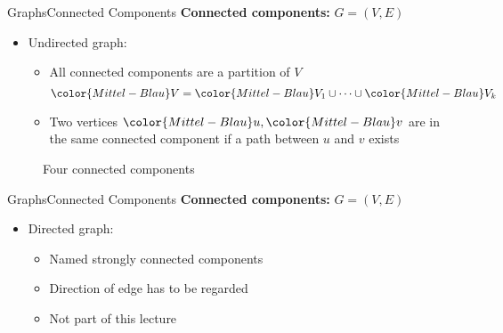 
\begin{frame}{Graphs}{Connected Components}
  \textbf{Connected components:}
  {\color{Mittel-Blau}$G = (V , E)$}
  \begin{itemize}
    \item
      Undirected graph:
      \begin{itemize}
        \item
          All connected components are a partition of {\color{Mittel-Blau}$V$}
          \begin{displaymath}
            {\color{Mittel-Blau}V}
              = {\color{Mittel-Blau}V_1} \cup \dots \cup 
              {\color{Mittel-Blau}V_k}
          \end{displaymath}
        \item
          Two vertices ${\color{Mittel-Blau}u}, {\color{Mittel-Blau}v}$
          are in the same connected component if a path between
          {\color{Mittel-Blau}$u$} and {\color{Mittel-Blau}$v$} exists
      \end{itemize}
  \end{itemize}
  \begin{figure}
    \begin{adjustbox}{width=0.65\linewidth}
      
    \end{adjustbox}
    \caption{Four connected components}
    \label{fig:graph:connected_components}
  \end{figure}
\end{frame}


\begin{frame}{Graphs}{Connected Components}
  \textbf{Connected components:}
  {\color{Mittel-Blau}$G = (V , E)$}
  \begin{itemize}
    \item
      Directed graph:
      \begin{itemize}
        \item
          Named {\color{Mittel-Blau}strongly connected components}
        \item
          Direction of edge has to be regarded
        \item
          Not part of this lecture
      \end{itemize}
  \end{itemize}
\end{frame}

